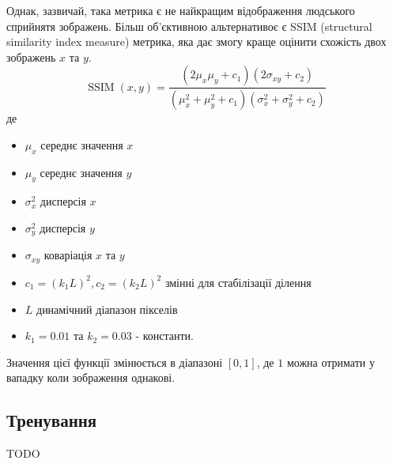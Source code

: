 \documentclass[14pt,a4paper]{extarticle}
\newcounter{e}
\numberwithin{equation}{section}
\numberwithin{figure}{section}
\begin{document}
	Однак, зазвичай, така метрика є не найкращим відображення людського сприйнятя зображень. Більш об'єктивною альтернативоє є SSIM (structural similarity index measure) метрика, яка дає змогу краще оцінити схожість двох зображень $x$ та $y$.
	\begin{equation}
		\operatorname{SSIM}(x, y)=\frac{\left(2 \mu_{x} \mu_{y}+c_{1}\right)\left(2 \sigma_{x 	y}+c_{2}\right)}{\left(\mu_{x}^{2}+\mu_{y}^{2}+c_{1}\right)\left(\sigma_{x}^{2}+\sigma_{y}^{2}+c_{2}\right)}
	\end{equation}
	де
	\begin{itemize}
		\item $\mu_{x}$ середнє значення $x$
		\item $\mu_{y}$ середнє значення $y$
		\item $\sigma_{x}^{2}$ дисперсія $x$
		\item $\sigma_{y}^{2}$ дисперсія  $y$
		\item $\sigma_{x y}$ коваріація $x$ та $y$
		\item $c_{1}=\left(k_{1} L\right)^{2}, c_{2}=\left(k_{2} L\right)^{2}$ змінні для стабілізації ділення
		\item $L$ динамічний діапазон пікселів
		\item $k_{1}=0.01$ та $k_{2}=0.03$ - константи.	
	\end{itemize}
	
	Значення цієї функції змінюється в діапазоні $[0, 1]$, де $1$ можна отримати у вападку коли зображення однакові.
			
	
	\subsection{Тренування}
	TODO
	
\end{document}
